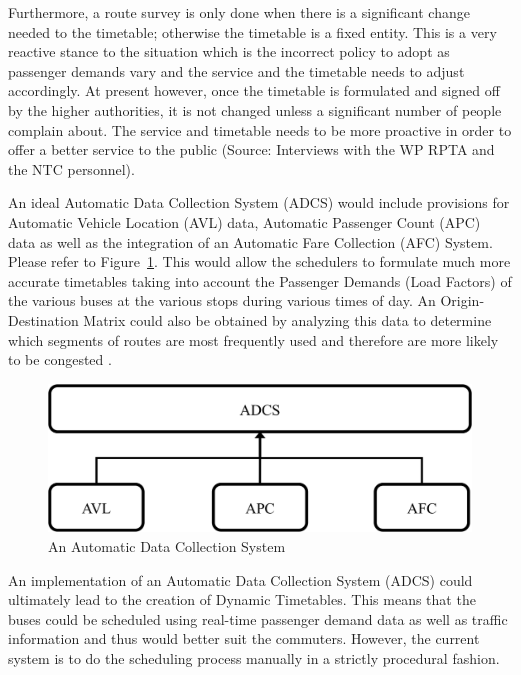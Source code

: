 Furthermore, a route survey is only done when there is a significant change needed to the timetable; otherwise the timetable is a fixed entity. This is a very reactive stance to the situation which is the incorrect policy to adopt as passenger demands vary and the service and the timetable needs to adjust accordingly. At present however, once the timetable is formulated and signed off by the higher authorities, it is not changed unless a significant number of people complain about. The service and timetable needs to be more proactive in order to offer a better service to the public (Source: Interviews with the WP RPTA and the NTC personnel).

An ideal Automatic Data Collection System (ADCS) would include provisions for Automatic Vehicle Location (AVL) data, Automatic Passenger Count (APC) data as well as the integration of an Automatic Fare Collection (AFC) System. Please refer to Figure~\ref{image-ADCS}. This would allow the schedulers to formulate much more accurate timetables taking into account the Passenger Demands (Load Factors) of the various buses at the various stops during various times of day. An Origin-Destination Matrix could also be obtained by analyzing this data to determine which segments of routes are most frequently used and therefore are more likely to be congested \cite{Wilson2008}.

\begin {figure} [h!]
\centering
\includegraphics[scale=0.6]{ADCS}
\caption [An Automatic Data Collection System] {An Automatic Data Collection System}
\label {image-ADCS}
\end {figure}

An implementation of an Automatic Data Collection System (ADCS) could ultimately lead to the creation of Dynamic Timetables. This means that the buses could be scheduled using real-time passenger demand data as well as traffic information and thus would better suit the commuters. However, the current system is to do the scheduling process manually in a strictly procedural fashion.

